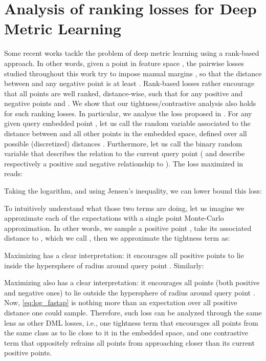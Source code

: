 \documentclass[runningheads]{llncs}
\begin{document}
\section{Analysis of ranking losses for Deep Metric Learning}

Some recent works \cite{cakir2019deep,wang2019ranked,rolinek2020optimizing} tackle the problem of deep metric learning using a rank-based approach. In other words, given a point in feature space , the pairwise losses studied throughout this work try to impose manual margins , so that the distance between  and any negative point  is at least . Rank-based losses rather encourage that all points are well ranked, distance-wise, such that  for any positive and negative points  and . We show that our tightness/contrastive analysis also holds for such ranking losses. In particular, we analyse the loss proposed in \cite{cakir2019deep}. For any given query embedded point , let us call  the random variable associated to the distance between  and all other points in the embedded space, defined over all possible (discretized) distances . Furthermore, let us call  the binary random variable that describes the relation to the current query point ( and  describe respectively a positive and negative relationship to ). The loss maximized in \cite{cakir2019deep} reads:

Taking the logarithm, and using Jensen's inequality, we can lower bound this loss:

To intuitively understand what those two terms are doing, let us imagine we approximate each of the expectations with a single point Monte-Carlo approximation. In other words, we sample a positive point , take its associated distance to , which we call , then we approximate the tightness term as:

Maximizing  has a clear interpretation: it encourages all positive points to lie inside the hypersphere of radius  around query point . Similarly:

Maximizing  also has a clear interpretation: it encourages all points (both positive and negative ones) to lie outside the hypersphere of radius  around query point . Now, \autoref{eq:log_fastap} is nothing more than an expectation over all positive distance  one could sample. Therefore, such loss can be analyzed through the same lens as other DML losses, i.e., one tightness term that encourages all points from the same class as  to lie close to it in the embedded space, and one contrastive term that oppositely refrains all points from approaching  closer than its current positive points.
\end{document}
